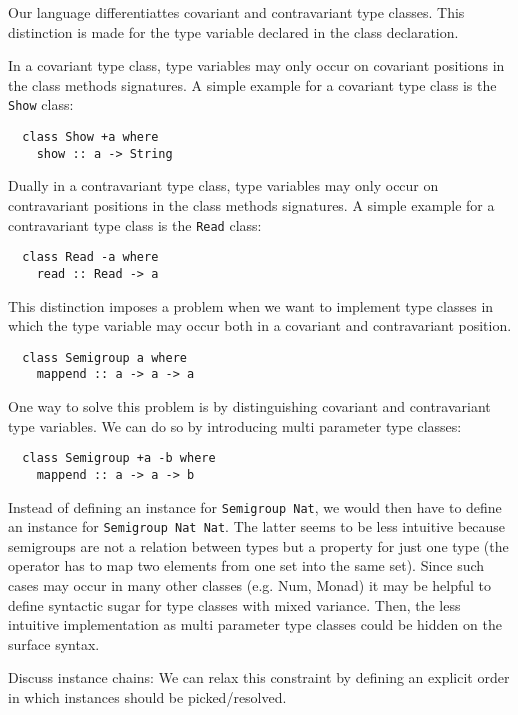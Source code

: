 Our language differentiattes covariant and contravariant type classes.
This distinction is made for the type variable declared in the class declaration.

In a covariant type class, type variables may only occur on covariant positions in the class methods signatures.
A simple example for a covariant type class is the \texttt{Show} class:

\begin{verbatim}
  class Show +a where
    show :: a -> String
\end{verbatim}

Dually in a contravariant type class, type variables may only occur on contravariant positions in the class methods signatures.
A simple example for a contravariant type class is the \texttt{Read} class:

\begin{verbatim}
  class Read -a where
    read :: Read -> a
\end{verbatim}

This distinction imposes a problem when we want to implement type classes in which the type variable may occur both in a covariant and contravariant position.

\begin{verbatim}
  class Semigroup a where
    mappend :: a -> a -> a
\end{verbatim}

One way to solve this problem is by distinguishing covariant and contravariant type variables.
We can do so by introducing multi parameter type classes:

\begin{verbatim}
  class Semigroup +a -b where
    mappend :: a -> a -> b
\end{verbatim}

Instead of defining an instance for \texttt{Semigroup Nat}, we would then have to define an instance for \texttt{Semigroup Nat Nat}.
The latter seems to be less intuitive because semigroups are not a relation between types but a property for just one type (the operator has to map two elements from one set into the same set).
Since such cases may occur in many other classes (e.g. Num, Monad) it may be helpful to define syntactic sugar for type classes with mixed variance.
Then, the less intuitive implementation as multi parameter type classes could be hidden on the surface syntax.

  Discuss instance chains:
  We can relax this constraint by defining an explicit order in which instances should be picked/resolved.
  \cite{morris2010instance}